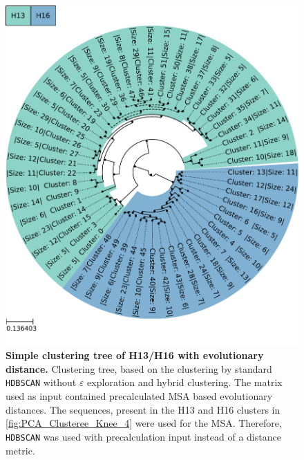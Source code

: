 \begin{figure}[!hbt]
    \centering
    \includegraphics[width=\textwidth]{PCA/Clustertree_Segment_4_H_Focus.pdf}
    \caption[Simple clustering tree of H13/H16 with evolutionary distance]{\textbf{Simple clustering tree of H13/H16 with evolutionary distance.} Clustering tree, based on the clustering by standard \texttt{HDBSCAN} without $\varepsilon$ exploration and hybrid clustering. The matrix used as input contained precalculated \gls{MSA} based evolutionary distances. The sequences, present in the H13 and H16 clusters in \autoref{fig:PCA_Clusteree_Knee_4} were used for the \gls{MSA}. Therefore, \texttt{HDBSCAN} was used with precalculation input instead of a distance metric.}
    \label{fig:Simple_Clustertree_MSA}
\end{figure}

